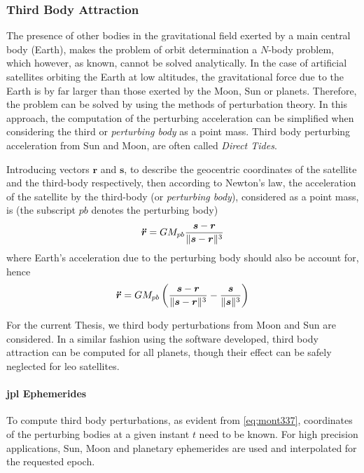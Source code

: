 \subsubsection{Third Body Attraction}\label{sssec:third-body-perturbations}

The presence of other bodies in the gravitational field exerted by a main central
body (Earth), makes the problem of orbit determination a $N$-body problem, which however, 
as known, cannot be solved analytically. In the case of artificial satellites orbiting 
the Earth at low altitudes, the gravitational force due to the Earth is by far larger 
than those exerted by the Moon, Sun or planets. Therefore, the problem can be solved 
by using the methods of perturbation theory. In this approach, the computation of the 
perturbing acceleration can be simplified when considering the third or \emph{perturbing body} 
as a point mass. Third body perturbing acceleration from Sun and Moon, are often 
called \emph{Direct Tides}.

Introducing vectors $\bm{r}$ and $\bm{s}$, to describe the geocentric coordinates 
of the satellite and the third-body respectively, then according to Newton's law, 
the acceleration of the satellite by the third-body (or \emph{perturbing body}), 
considered as a point mass, is (the subscript $pb$ denotes the perturbing body)
\begin{equation}
    \bm{\ddot{r}} = GM_{pb} \frac{\bm{s}-\bm{r}}
        {\lVert\bm{s}-\bm{r}\rVert^3}
\end{equation}
where Earth's acceleration due to the perturbing body should also be account for, 
hence
\begin{equation}\label{eq:mont337}
    \bm{\ddot{r}} = GM_{pb} \left( 
        \frac{\bm{s}-\bm{r}}{\lVert\bm{s}-\bm{r}\rVert^3} 
        - \frac{\bm{s}}{\lVert\bm{s}\rVert^3} \right)
\end{equation}

For the current Thesis, we third body perturbations from Moon and Sun are considered. 
In a similar fashion using the software developed, third body attraction can be 
computed for all planets, though their effect can be safely neglected 
for \gls{leo} satellites.

\paragraph{\gls{jpl} Ephemerides}\label{par:jpl-ephemerides}

To compute third body perturbations, as evident from \autoref{eq:mont337}, 
coordinates of the perturbing bodies at a given instant $t$ need to be known. For high 
precision applications, Sun, Moon and planetary ephemerides are used and interpolated 
for the requested epoch.

